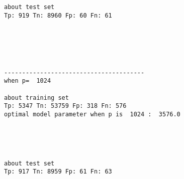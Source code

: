 \documentclass[11pt]{article}
\begin{document}
    \begin{center}
    \end{center}
    { \hspace*{\fill} \\}
    
    \begin{Verbatim}[commandchars=\\\{\}]


about test set
Tp: 919 Tn: 8960 Fp: 60 Fn: 61

    \end{Verbatim}

    \begin{center}
    \end{center}
    { \hspace*{\fill} \\}
    
    \begin{Verbatim}[commandchars=\\\{\}]



---------------------------------------
when p=  1024

about training set
Tp: 5347 Tn: 53759 Fp: 318 Fn: 576
optimal model parameter when p is  1024 :  3576.0

    \end{Verbatim}

    \begin{center}
    \end{center}
    { \hspace*{\fill} \\}
    
    \begin{Verbatim}[commandchars=\\\{\}]


about test set
Tp: 917 Tn: 8959 Fp: 61 Fn: 63

    \end{Verbatim}

    \begin{center}
    \end{center}
    { \hspace*{\fill} \\}
    

    
    
    
    
\end{document}
